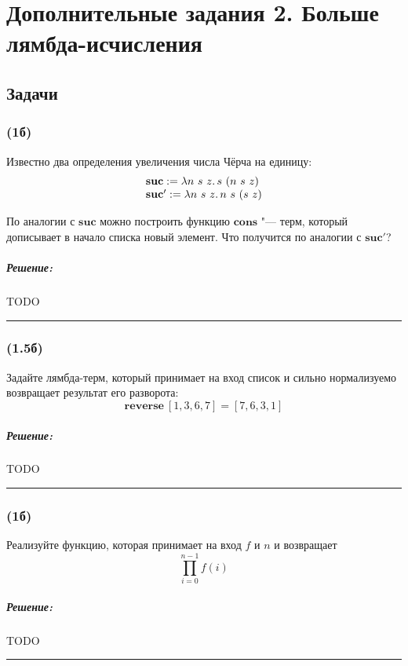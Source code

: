 \documentclass{article}
\newenvironment{proof}{\subparagraph{\hspace{-1em}Решение:\newline}}{\par\noindent\rule{\textwidth}{0.4pt}}
\begin{document}
    \section*{Дополнительные задания 2. Больше лямбда-исчисления}

    \subsection{Задачи}

    \subsubsection{(1б)}

    Известно два определения увеличения числа Чёрча на единицу:
    $$\begin{array}{l}
        \mathbf{suc} := \lambda n~s~z\ldotp s~(n~s~z) \\
        \mathbf{suc'} := \lambda n~s~z\ldotp n~s~(s~z) \\
    \end{array}$$
    
    По аналогии с $\mathbf{suc}$ можно
    построить функцию $\mathbf{cons}$ "--- терм, который дописывает в начало
    списка новый элемент. Что получится по аналогии с $\mathbf{suc'}$?

    \begin{proof}
        TODO %
    \end{proof}

    \subsubsection{(1.5б)}

    Задайте лямбда-терм, который принимает на вход список и сильно
    нормализуемо возвращает результат его разворота:
    $$\mathbf{reverse}~[1, 3, 6, 7] = [7, 6, 3, 1]$$

    \begin{proof}
        TODO %
    \end{proof}

    \subsubsection{(1б)}

    Реализуйте функцию, которая принимает на вход $f$ и $n$ и возвращает
    $$\prod_{i = 0}^{n-1} f(i)$$

    \begin{proof}
        TODO %
    \end{proof}
\end{document}
